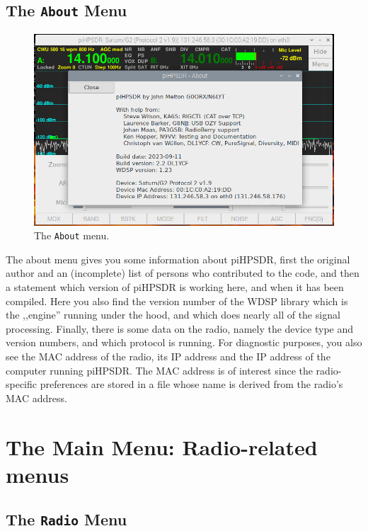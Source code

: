 \documentclass[12pt]{book}
\def\bltt#1{\texttt{\color{blue}#1}}
\begin{document}
\clearpage
\section{The \texttt{About} Menu}

\begin{figure}[ht]
\center
\includegraphics[width=12cm]{AboutMenu.png}
\caption{The \bltt{About} menu.}
\end{figure}

The about menu gives you some information about piHPSDR, first the original author
and an (incomplete) list
of persons who contributed to the code, and then a statement which version of piHPSDR
is working here, and when it has been compiled. Here you also find the version number of the WDSP
 library which is the ,,engine''
running under the hood, and which does nearly all of the signal processing. Finally, there is
some data on the radio, namely the device type and version numbers, and which protocol is running.
For diagnostic purposes, you also see the MAC address of the radio, its IP address and the
IP address of the computer running piHPSDR. The MAC address is of interest since the radio-specific
preferences are stored in a file whose name is derived from the radio's MAC address.

\chapter{The Main Menu: Radio-related menus}
\section{The \texttt{Radio} Menu}
\end{document}
